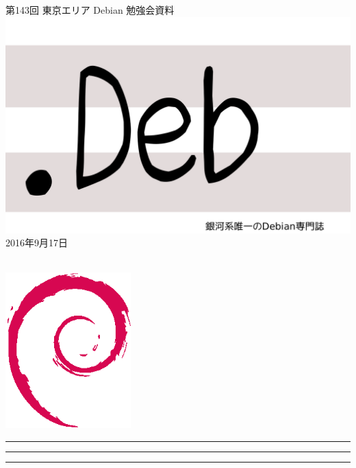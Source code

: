 \documentclass[mingoth,a4paper]{jsarticle}
\newcommand{\debmtgyear}{2016}
\newcommand{\debmtgmonth}{9}
\newcommand{\debmtgdate}{17}
\newcommand{\debmtgnumber}{143}
\begin{document}
\begin{titlepage}
\thispagestyle{empty}

\vspace*{-2cm}
第\debmtgnumber{}回 東京エリア Debian 勉強会資料\\
\hspace*{-2cm}
\includegraphics{image2012-natsu/dotdeb.pdf}\\
\hfill{}\debmtgyear{}年\debmtgmonth{}月\debmtgdate{}日

\\

\vspace*{-2cm}
\hfill{}\includegraphics[height=6cm]{image200502/openlogo-nd.eps}
\end{titlepage}

\newpage

\begin{minipage}[b]{0.2\hsize}
 \colorbox{titleback}{}
\end{minipage}
\begin{minipage}[b]{0.8\hsize}
\hrule
\vspace{2mm}
\hrule
\begin{multicols}{2}
\tableofcontents
\end{multicols}
\vspace{2mm}
\hrule
\end{minipage}
\end{document}
